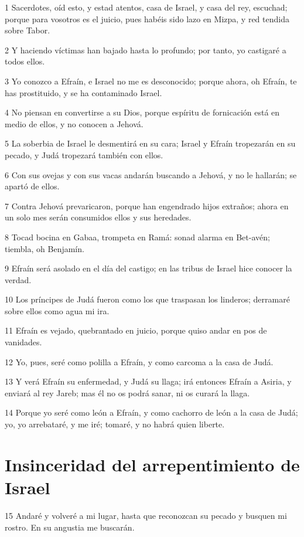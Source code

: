 \par 1 Sacerdotes, oíd esto, y estad atentos, casa de Israel, y casa del rey, escuchad; porque para vosotros es el juicio, pues habéis sido lazo en Mizpa, y red tendida sobre Tabor.
\par 2 Y haciendo víctimas han bajado hasta lo profundo; por tanto, yo castigaré a todos ellos.
\par 3 Yo conozco a Efraín, e Israel no me es desconocido; porque ahora, oh Efraín, te has prostituido, y se ha contaminado Israel.
\par 4 No piensan en convertirse a su Dios, porque espíritu de fornicación está en medio de ellos, y no conocen a Jehová.
\par 5 La soberbia de Israel le desmentirá en su cara; Israel y Efraín tropezarán en su pecado, y Judá tropezará también con ellos.
\par 6 Con sus ovejas y con sus vacas andarán buscando a Jehová, y no le hallarán; se apartó de ellos.
\par 7 Contra Jehová prevaricaron, porque han engendrado hijos extraños; ahora en un solo mes serán consumidos ellos y sus heredades.
\par 8 Tocad bocina en Gabaa, trompeta en Ramá: sonad alarma en Bet-avén; tiembla, oh Benjamín.
\par 9 Efraín será asolado en el día del castigo; en las tribus de Israel hice conocer la verdad.
\par 10 Los príncipes de Judá fueron como los que traspasan los linderos; derramaré sobre ellos como agua mi ira.
\par 11 Efraín es vejado, quebrantado en juicio, porque quiso andar en pos de vanidades.
\par 12 Yo, pues, seré como polilla a Efraín, y como carcoma a la casa de Judá.
\par 13 Y verá Efraín su enfermedad, y Judá su llaga; irá entonces Efraín a Asiria, y enviará al rey Jareb; mas él no os podrá sanar, ni os curará la llaga.
\par 14 Porque yo seré como león a Efraín, y como cachorro de león a la casa de Judá; yo, yo arrebataré, y me iré; tomaré, y no habrá quien liberte.

\section*{Insinceridad del arrepentimiento de Israel}

\par 15 Andaré y volveré a mi lugar, hasta que reconozcan su pecado y busquen mi rostro. En su angustia me buscarán.

